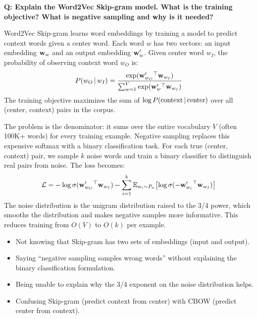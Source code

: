 \begin{interviewq}
\textbf{Q: Explain the Word2Vec Skip-gram model. What is the training
objective? What is negative sampling and why is it needed?}

 \quad {} \quad \badgefreq{\freqhigh}

\stronganswer
Word2Vec Skip-gram learns word embeddings by training a model to predict
context words given a center word.  Each word $w$ has two vectors: an input
embedding $\mathbf{w}_w$ and an output embedding $\mathbf{w}'_w$.  Given center word $w_I$,
the probability of observing context word $w_O$ is:
\[
    P(w_O \,|\, w_I)
    = \frac{\exp(\mathbf{w}'_{w_O}{}^\top \mathbf{w}_{w_I})}
           {\sum_{w=1}^{V} \exp(\mathbf{w}'_w{}^\top \mathbf{w}_{w_I})}
\]
The training objective maximizes the sum of $\log P(\text{context} \,|\,
\text{center})$ over all (center, context) pairs in the corpus.

The problem is the denominator: it sums over the entire vocabulary $V$ (often
100K+ words) for every training example.  Negative sampling replaces this
expensive softmax with a binary classification task.  For each true
(center, context) pair, we sample $k$ noise words and train a binary
classifier to distinguish real pairs from noise.  The loss becomes:
\[
    \mathcal{L} = -\log\sigma(\mathbf{w}'_{w_O}{}^\top \mathbf{w}_{w_I})
            - \sum_{i=1}^{k} \operatorname{\mathbb{E}}_{w_i \sim P_n}\bigl[
              \log\sigma(-\mathbf{w}'_{w_i}{}^\top \mathbf{w}_{w_I})\bigr]
\]
The noise distribution is the unigram distribution raised to the 3/4 power,
which smooths the distribution and makes negative samples more informative.
This reduces training from $O(V)$ to $O(k)$ per example.

\redflags
\begin{itemize}
    \item Not knowing that Skip-gram has two sets of embeddings (input and
    output).
    \item Saying ``negative sampling samples wrong words'' without explaining
    the binary classification formulation.
    \item Being unable to explain why the 3/4 exponent on the noise
    distribution helps.
    \item Confusing Skip-gram (predict context from center) with CBOW
    (predict center from context).
\end{itemize}



\end{interviewq}
